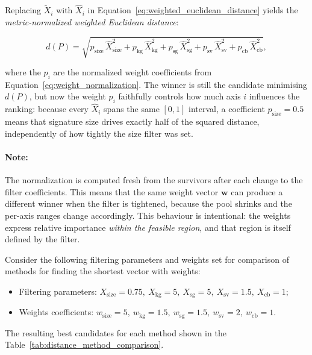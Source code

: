 Replacing $\widetilde{X}_i$ with $\widehat{X}_i$ in Equation~\eqref{eq:weighted_euclidean_distance} yields the \emph{metric-normalized weighted Euclidean distance}:

\begin{equation}
    d(P) = \sqrt{
        p_{\text{size}}\,\widehat{X}_{\text{size}}^2 +
        p_{\text{kg}}\,\widehat{X}_{\text{kg}}^2 +
        p_{\text{sg}}\,\widehat{X}_{\text{sg}}^2 +
        p_{\text{sv}}\,\widehat{X}_{\text{sv}}^2 +
        p_{\text{cb}}\,\widehat{X}_{\text{cb}}^2
    },
    \label{eq:normalized_weighted_distance}
\end{equation}

where the $p_i$ are the normalized weight coefficients from Equation~\eqref{eq:weight_normalization}.
The winner is still the candidate minimising $d(P)$, but now the weight $p_i$ faithfully controls how much axis $i$ influences the ranking: because every $\widehat{X}_i$ spans the same $[0, 1]$ interval, a coefficient $p_{\text{size}} = 0.5$ means that signature size drives exactly half of the squared distance, independently of how tightly the size filter was set.

\paragraph{Note:}
The normalization is computed fresh from the survivors after each change to the filter coefficients.
This means that the same weight vector $\mathbf{w}$ can produce a different winner when the filter is tightened, because the pool shrinks and the per-axis ranges change accordingly.
This behaviour is intentional: the weights express relative importance \emph{within the feasible region}, and that region is itself defined by the filter.

Consider the following filtering parameters and weights set for comparison of methods for finding the shortest vector with weights: 

\begin{itemize}
    \item Filtering parameters: $X_{\text{size}} = 0.75, \ X_{\text{kg}} = 5, \ X_{\text{sg}} = 5, \ X_{\text{sv}} = 1.5, \ X_{\text{cb}} = 1$;
    \item Weights coefficients: $w_{\text{size}} = 5, \ w_{\text{kg}} = 1.5, \ w_{\text{sg}} = 1.5, \ w_{\text{sv}} = 2, \ w_{\text{cb}} = 1$.
\end{itemize}

The resulting best candidates for each method shown in the Table~\ref{tab:distance_method_comparison}.

